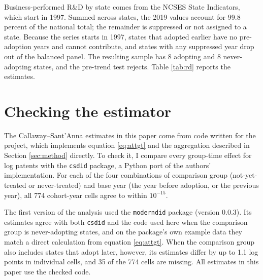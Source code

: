 \documentclass[12pt]{article}
\begin{document}
Business-performed R\&D by state comes from the NCSES State Indicators, which start in 1997. Summed across
states, the 2019 values account for 99.8 percent of the national total; the remainder is suppressed or not
assigned to a state. Because the series starts in 1997, states that adopted earlier have no pre-adoption years
and cannot contribute, and states with any suppressed year drop out of the balanced panel. The resulting sample
has 8 adopting and 8 never-adopting states, and the pre-trend test rejects. Table \ref{tab:rd} reports the
estimates.



\section{Checking the estimator}\label{app:check}

The Callaway--Sant'Anna estimates in this paper come from code written for the project, which implements
equation \eqref{eq:attgt} and the aggregation described in Section \ref{sec:method} directly. To check it, I
compare every group-time effect for log patents with the \texttt{csdid} package, a Python port of the authors'
implementation. For each of the four combinations of comparison group (not-yet-treated or never-treated) and
base year (the year before adoption, or the previous year), all 774 cohort-year cells agree to within $10^{-15}$.

The first version of the analysis used the \texttt{moderndid} package (version 0.0.3). Its estimates agree with
both \texttt{csdid} and the code used here when the comparison group is never-adopting states, and on the
package's own example data they match a direct calculation from equation \eqref{eq:attgt}. When the
comparison group also includes states that adopt later, however, its estimates differ by up to 1.1 log points
in individual cells, and 35 of the 774 cells are missing. All estimates in this paper use the checked code.
\end{document}
